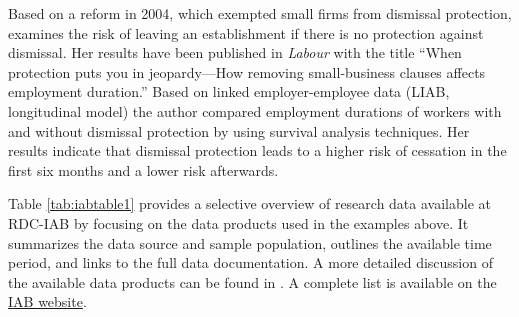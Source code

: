 Based on a reform in 2004, which exempted small firms from dismissal protection, \citep{lucke2018} examines the risk of leaving an establishment if there is no protection against dismissal. Her results have been published in \emph{Labour} with the title ``When protection puts you in jeopardy---How removing small-business clauses affects employment duration.'' Based on linked employer-employee data (LIAB, longitudinal model) the author compared employment durations of workers with and without dismissal protection by using survival analysis techniques. Her results indicate that dismissal protection leads to a higher risk of cessation in the first six months and a lower risk afterwards.

Table \ref{tab:iabtable1} provides a selective overview of research data available at RDC-IAB by focusing on the data products used in the examples above. It summarizes the data source and sample population, outlines the available time period, and links to the full data documentation. A more detailed discussion of the available data products can be found in \citep{muller2019, muller2020}. A complete list is available on the \href{https://fdz.iab.de/en/FDZ_Overview_of_Data.aspx}{IAB website}.

